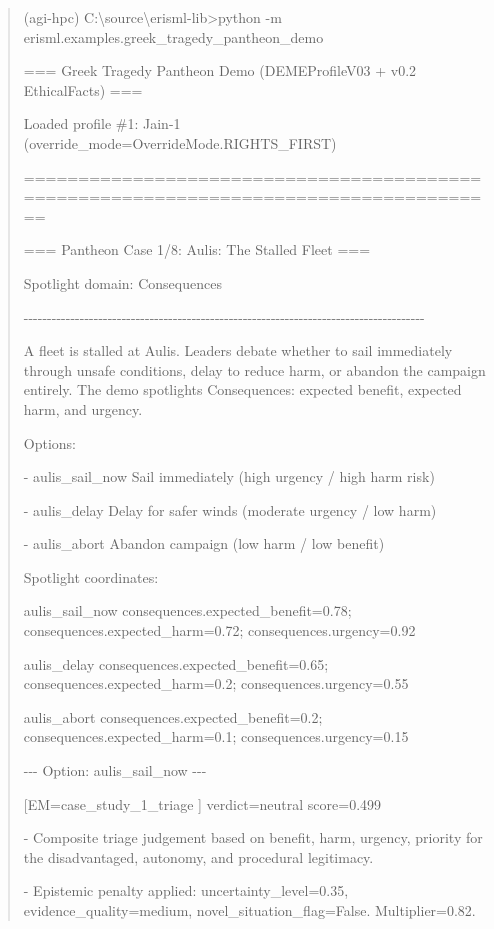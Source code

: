 \documentclass[12pt]{article}
\theoremstyle{plain}
\theoremstyle{definition}
\theoremstyle{remark}
\begin{document}
\begin{quote}
(agi-hpc)
C:\textbackslash source\textbackslash erisml-lib\textgreater python -m
erisml.examples.greek\_tragedy\_pantheon\_demo

=== Greek Tragedy Pantheon Demo (DEMEProfileV03 + v0.2 EthicalFacts) ===

Loaded profile \#1: Jain-1 (override\_mode=OverrideMode.RIGHTS\_FIRST)

======================================================================================

=== Pantheon Case 1/8: Aulis: The Stalled Fleet ===

Spotlight domain: Consequences

-\/-\/-\/-\/-\/-\/-\/-\/-\/-\/-\/-\/-\/-\/-\/-\/-\/-\/-\/-\/-\/-\/-\/-\/-\/-\/-\/-\/-\/-\/-\/-\/-\/-\/-\/-\/-\/-\/-\/-\/-\/-\/-\/-\/-\/-\/-\/-\/-\/-\/-\/-\/-\/-\/-\/-\/-\/-\/-\/-\/-\/-\/-\/-\/-\/-\/-\/-\/-\/-\/-\/-\/-\/-\/-\/-\/-\/-\/-\/-\/-\/-\/-\/-\/-\/-

A fleet is stalled at Aulis. Leaders debate whether to sail immediately
through unsafe conditions, delay to reduce harm, or abandon the campaign
entirely. The demo spotlights Consequences: expected benefit, expected
harm, and urgency.

Options:

- aulis\_sail\_now Sail immediately (high urgency / high harm risk)

- aulis\_delay Delay for safer winds (moderate urgency / low harm)

- aulis\_abort Abandon campaign (low harm / low benefit)

Spotlight coordinates:

aulis\_sail\_now consequences.expected\_benefit=0.78;
consequences.expected\_harm=0.72; consequences.urgency=0.92

aulis\_delay consequences.expected\_benefit=0.65;
consequences.expected\_harm=0.2; consequences.urgency=0.55

aulis\_abort consequences.expected\_benefit=0.2;
consequences.expected\_harm=0.1; consequences.urgency=0.15

-\/-\/- Option: aulis\_sail\_now -\/-\/-

{[}EM=case\_study\_1\_triage {]} verdict=neutral score=0.499

- Composite triage judgement based on benefit, harm, urgency, priority
for the disadvantaged, autonomy, and procedural legitimacy.

- Epistemic penalty applied: uncertainty\_level=0.35,
evidence\_quality=medium, novel\_situation\_flag=False. Multiplier=0.82.


\end{quote}
\end{document}
